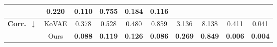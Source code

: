 \documentclass{article}
\theoremstyle{plain}
\theoremstyle{definition}
\theoremstyle{remark}
\begin{document}
\begin{table}[!t]
{\begin{tabular}{cc|cccccccc}
          & \cellcolor{blue!10}\textbf{0.220}
          & \cellcolor{blue!10}\textbf{0.110}
          & \cellcolor{blue!10}\textbf{0.755}
          & \cellcolor{blue!10}\textbf{0.184}
          & \cellcolor{blue!10}\textbf{0.116} \\
    \midrule
    \multirow{2}{*}{\textbf{Corr.}~$\downarrow$}
      & KoVAE 
          & 0.378 
          & 0.528 
          & 0.480 
          & 0.859 
          & 3.136 
          & 8.138 
          & 0.411 
          & 0.041 \\
      & Ours  
          & \cellcolor{blue!10}\textbf{0.088}
          & \cellcolor{blue!10}\textbf{0.119}
          & \cellcolor{blue!10}\textbf{0.126}
          & \cellcolor{blue!10}\textbf{0.086}
          & \cellcolor{blue!10}\textbf{0.269}
          & \cellcolor{blue!10}\textbf{0.849}
          & \cellcolor{blue!10}\textbf{0.006}
          & \cellcolor{blue!10}\textbf{0.004} \\
    \midrule
    

\end{tabular}}
\end{table}
\end{document}
